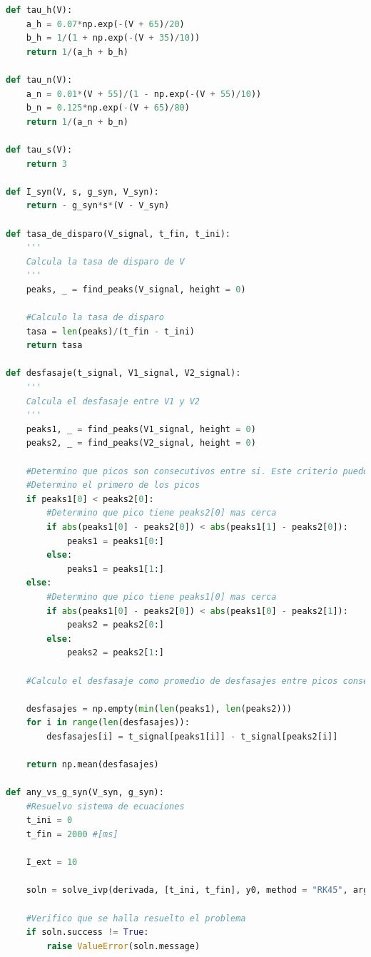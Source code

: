 \documentclass[aps,prb,twocolumn,superscriptaddress,floatfix,longbibliography]{revtex4-2}
\begin{document}
\begin{lstlisting}[language=Python]
def tau_h(V):
    a_h = 0.07*np.exp(-(V + 65)/20)
    b_h = 1/(1 + np.exp(-(V + 35)/10))
    return 1/(a_h + b_h)

def tau_n(V):
    a_n = 0.01*(V + 55)/(1 - np.exp(-(V + 55)/10))
    b_n = 0.125*np.exp(-(V + 65)/80)
    return 1/(a_n + b_n)

def tau_s(V):
    return 3

def I_syn(V, s, g_syn, V_syn):
    return - g_syn*s*(V - V_syn)

def tasa_de_disparo(V_signal, t_fin, t_ini):
    '''
    Calcula la tasa de disparo de V
    '''
    peaks, _ = find_peaks(V_signal, height = 0)
    
    #Calculo la tasa de disparo
    tasa = len(peaks)/(t_fin - t_ini)
    return tasa

def desfasaje(t_signal, V1_signal, V2_signal):
    '''
    Calcula el desfasaje entre V1 y V2
    '''
    peaks1, _ = find_peaks(V1_signal, height = 0)
    peaks2, _ = find_peaks(V2_signal, height = 0)
    
    #Determino que picos son consecutivos entre si. Este criterio puedo aplicarlo porque ya conozco como se comporta el problema
    #Determino el primero de los picos
    if peaks1[0] < peaks2[0]:
        #Determino que pico tiene peaks2[0] mas cerca
        if abs(peaks1[0] - peaks2[0]) < abs(peaks1[1] - peaks2[0]):
            peaks1 = peaks1[0:]
        else:
            peaks1 = peaks1[1:]
    else:
        #Determino que pico tiene peaks1[0] mas cerca
        if abs(peaks1[0] - peaks2[0]) < abs(peaks1[0] - peaks2[1]):
            peaks2 = peaks2[0:]
        else:
            peaks2 = peaks2[1:]

    #Calculo el desfasaje como promedio de desfasajes entre picos consecutivos

    desfasajes = np.empty(min(len(peaks1), len(peaks2)))
    for i in range(len(desfasajes)):
        desfasajes[i] = t_signal[peaks1[i]] - t_signal[peaks2[i]]
    
    return np.mean(desfasajes)

def any_vs_g_syn(V_syn, g_syn):
    #Resuelvo sistema de ecuaciones
    t_ini = 0
    t_fin = 2000 #[ms]

    I_ext = 10

    soln = solve_ivp(derivada, [t_ini, t_fin], y0, method = "RK45", args = (I_ext,g_syn,V_syn), dense_output = True)

    #Verifico que se halla resuelto el problema
    if soln.success != True:
        raise ValueError(soln.message)


\end{lstlisting}
\end{document}
